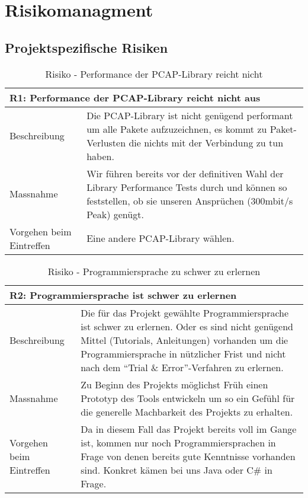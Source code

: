 \section{Risikomanagment}
\label{sec:Risikomanagment}

\subsection{Projektspezifische Risiken}

\begin{table}[H]
\begin{tabularx}{\textwidth}{l|>{\raggedright\arraybackslash}X}
\multicolumn{2}{l}{\textbf{R1: Performance der \ac{PCAP}-Library reicht nicht aus}} \\
\hline
Beschreibung & Die \ac{PCAP}-Library ist nicht genügend performant um alle Pakete aufzuzeichnen, es kommt zu Paket-Verlusten die nichts mit der Verbindung zu tun haben. \\
\hline
Massnahme & Wir führen bereits vor der definitiven Wahl der Library Performance Tests durch und können so feststellen, ob sie unseren Ansprüchen (300mbit/s Peak) genügt. \\
\hline
Vorgehen beim Eintreffen & Eine andere \ac{PCAP}-Library wählen.\\
\end{tabularx}
\caption{Risiko - Performance der \ac{PCAP}-Library reicht nicht}
\end{table}

\begin{table}[H]
\begin{tabularx}{\textwidth}{l|>{\raggedright\arraybackslash}X}
\multicolumn{2}{l}{\textbf{R2: Programmiersprache ist schwer zu erlernen}} \\
\hline
Beschreibung & Die für das Projekt gewählte Programmiersprache ist schwer zu erlernen. Oder es sind nicht genügend Mittel (Tutorials, Anleitungen) vorhanden um die Programmiersprache in nützlicher Frist und nicht nach dem \enquote{Trial \& Error}-Verfahren zu erlernen.\\
\hline
Massnahme & Zu Beginn des Projekts möglichst Früh einen Prototyp des Tools entwickeln um so ein Gefühl für die generelle Machbarkeit des Projekts zu erhalten.\\
\hline
Vorgehen beim Eintreffen & Da in diesem Fall das Projekt bereits voll im Gange ist, kommen nur noch Programmiersprachen in Frage von denen bereits gute Kenntnisse vorhanden sind. Konkret kämen bei uns Java oder C\# in Frage.\\
\end{tabularx}
\caption{Risiko - Programmiersprache zu schwer zu erlernen}
\end{table}

